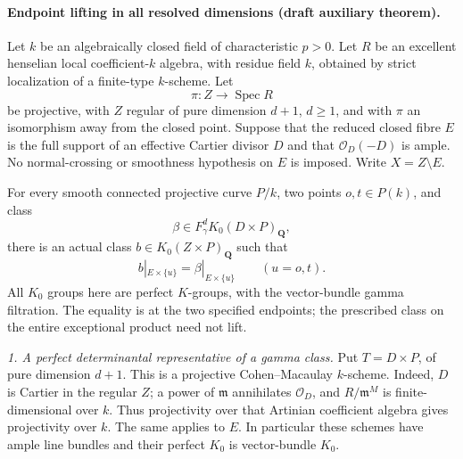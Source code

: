 \paragraph{Endpoint lifting in all resolved dimensions
(draft auxiliary theorem).}
Let $k$ be an algebraically closed field of characteristic $p>0$.
Let $R$ be an excellent henselian local coefficient-$k$ algebra,
with residue field $k$, obtained by strict localization of a
finite-type $k$-scheme.  Let
\[
 \pi:Z\longrightarrow\operatorname{Spec}R
\]
be projective, with $Z$ regular of pure dimension $d+1$, $d\geq1$,
and with $\pi$ an isomorphism away from the closed point.  Suppose
that the reduced closed fibre $E$ is the full support of an effective
Cartier divisor $D$ and that $\mathcal O_D(-D)$ is ample.  No
normal-crossing or smoothness hypothesis on $E$ is imposed.
Write $X=Z\setminus E$.

For every smooth connected projective curve $P/k$, two points
$o,t\in P(k)$, and class
\[
             \beta\in F_\gamma^dK_0(D\times P)_{\mathbf Q},
\]
there is an actual class $b\in K_0(Z\times P)_{\mathbf Q}$ such that
\begin{equation}
       b|_{E\times\{u\}}=\beta|_{E\times\{u\}}
                    \qquad(u=o,t).                    \tag{AE.1}
\end{equation}
All $K_0$ groups here are perfect $K$-groups, with the vector-bundle
gamma filtration.  The equality is at the two specified endpoints;
the prescribed class on the entire exceptional product need not lift.

\emph{1. A perfect determinantal representative of a gamma class.}
Put $T=D\times P$, of pure dimension $d+1$.  This is a projective
Cohen--Macaulay $k$-scheme.  Indeed, $D$ is Cartier in the regular
$Z$; a power of $\mathfrak m$ annihilates $\mathcal O_D$, and
$R/\mathfrak m^M$ is finite-dimensional over $k$.  Thus projectivity
over that Artinian coefficient algebra gives projectivity over $k$.
The same applies to $E$.  In particular these schemes have ample
line bundles and their perfect $K_0$ is vector-bundle $K_0$.

